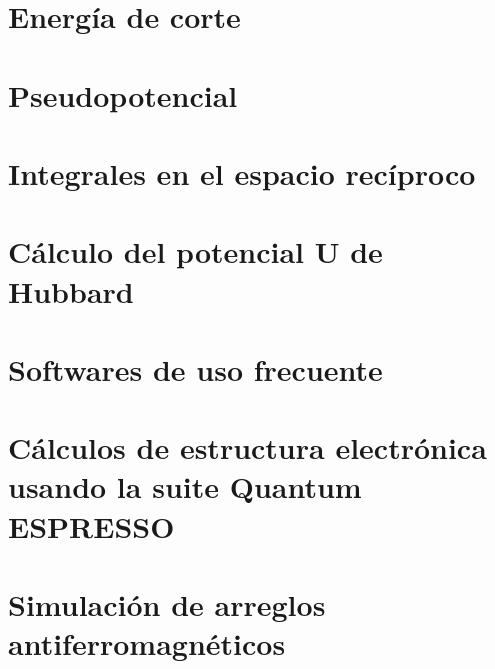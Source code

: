 



\section{Energ\'ia de corte}



\section{Pseudopotencial}



\section{Integrales en el espacio rec\'iproco}



\section{C\'alculo del potencial U de Hubbard}



\section{Softwares de uso frecuente}



\section[C\'alculos de estructura electr\'onica usando la suite Quantum \\
ESPRESSO]{C\'alculos de estructura electr\'onica usando la suite Quantum 
	ESPRESSO}



\section[Simulaci\'on de arreglos antiferromagn\'eticos]{Simulaci\'on de arreglos antiferromagn\'eticos}
